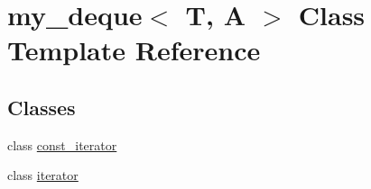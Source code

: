 \hypertarget{classmy__deque}{\section{my\-\_\-deque$<$ T, A $>$ Class Template Reference}
\label{classmy__deque}
}
\subsection*{Classes}
\begin{DoxyCompactItemize}
\item 
class \hyperlink{classmy__deque_1_1const__iterator}{const\-\_\-iterator}
\item 
class \hyperlink{classmy__deque_1_1iterator}{iterator}
\end{DoxyCompactItemize}
